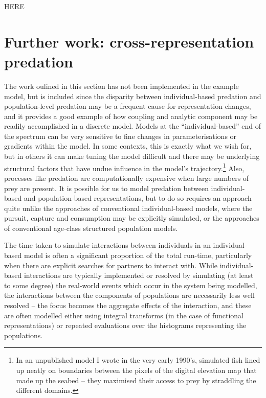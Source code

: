 {\Huge{HERE}}


\section{Further work: cross-representation predation\label{predation5}}

The work oulined in this section has not been implemented in the
example model, but is included since the disparity between
individual-based predation and population-level predation may be a
frequent cause for representation changes, and it provides a good
example of how coupling and analytic component may be readily
accomplished in a discrete model. Models at the ``individual-based''
end of the spectrum can be very sensitive to fine changes in
parameterisations or gradients within the model.  In some contexts,
this is exactly what we wish for, but in others it can make tuning
the model difficult and there may be underlying structural factors
that have undue influence in the model's trajectory.\footnote{In an
  unpublished model I wrote in the very early 1990's, simulated
  fish lined up neatly on boundaries between the pixels of the digital
  elevation map that made up the seabed -- they maximised their
  access to prey by straddling the different domains.}
Also, processes like predation are computationally expensive when
large numbers of prey are present.  It is possible for us to
model predation between individual-based and population-based
representations, but to do so requires an approach quite unlike the
approaches of conventional individual-based models, where the pursuit,
capture and consumption may be explicitly simulated, or the approaches
of conventional age-class structured population models.

The time taken to simulate interactions between individuals in an
individual-based model is often a significant proportion of the total
run-time, particularly when there are explicit searches for partners
to interact with.  While individual-based interactions are typically
implemented or resolved by simulating (at least to some degree) the
real-world events which occur in the system being modelled, the
interactions between the components of populations are necessarily
less well resolved -- the focus becomes the aggregate effects of the
interaction, and these are often modelled either using integral
transforms (in the case of functional representations) or repeated
evaluations over the histograms representing the populations.


